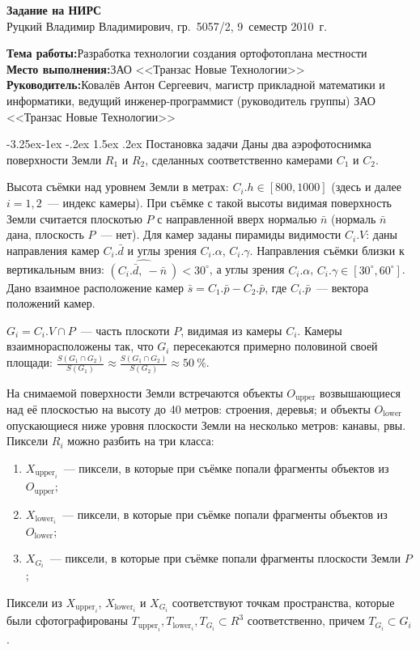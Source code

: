 \documentclass[a4paper,10pt]{article}
\makeatletter
\renewcommand\paragraph{\@startsection{paragraph}{4}{\z@}%
  {-3.25ex\@plus -1ex \@minus -.2ex}%
  {1.5ex \@plus .2ex}%
  {\normalfont\normalsize\bfseries}}
\makeatother
\begin{document}
\begin{center}
\begin{spacing}{1.5}
  {\Large\bfseries Задание на НИРС} \\
  {\large Руцкий Владимир Владимирович, гр.~5057/2, 9~семестр 2010~г.}
\end{spacing}
\end{center}

\noindent\textbf{Тема работы:}\quad Разработка технологии создания ортофотоплана местности \\
\textbf{Место выполнения:}\quad ЗАО <<Транзас Новые Технологии>> \\
\textbf{Руководитель:}\quad Ковалёв Антон Сергеевич, 
магистр прикладной математики и информатики, 
ведущий инженер-программист (руководитель группы) ЗАО <<Транзас Новые Технологии>>

\paragraph{Постановка задачи}
Даны два аэрофотоснимка поверхности Земли $R_1$ и $R_2$, 
сделанных соответственно камерами $C_1$ и $C_2$.

Высота съёмки над уровнем Земли в метрах: $C_i.h \in [800, 1000]$ (здесь и далее $i=1,2$~--- индекс камеры).
При съёмке с такой высоты видимая поверхность Земли считается плоскотью $P$ с направленной вверх нормалью $\bar{n}$
(нормаль $\bar{n}$ дана, плоскость $P$~--- нет).
Для камер заданы пирамиды видимости $C_i.V$: 
даны направления камер $C_i.\bar{d}$ и углы зрения $C_i.\alpha$, $C_i.\gamma$.
Направления съёмки близки к вертикальным вниз: $\widehat{(C_i.\bar{d}, \ -\bar{n}\ )} < 30^{\circ}$,
а углы зрения $C_i.\alpha$, $C_i.\gamma \in [30^{\circ}, 60^{\circ}]$.
Дано взаимное расположение камер $\bar{s}=C_1.\bar{p} - C_2.\bar{p}$, 
где $C_i.\bar{p}$~--- вектора положений камер.

$G_i = C_i.V \cap P$~--- часть плоскоти $P$, видимая из камеры $C_i$.
Камеры взаимнорасположены так, что $G_i$ пересекаются примерно половиной своей площади:
$\frac{S(G_1 \cap G_2)}{S(G_1)} \approx \frac{S(G_1 \cap G_2)}{S(G_2)} \approx 50~\%$.

На снимаемой поверхности Земли встречаются объекты $O_{\mathrm{upper}}$ возвышающиеся над её плоскостью на высоту до 40 метров: 
строения, деревья; 
и объекты $O_{\mathrm{lower}}$ опускающиеся ниже уровня плоскости Земли на несколько метров: канавы, рвы.
Пиксели $R_i$ можно разбить на три класса: 
\begin{enumerate}[label=\arabic*)]
  \item $X_{\mathrm{upper}_i}$~--- пиксели, в которые при съёмке попали фрагменты объектов из $O_{\mathrm{upper}}$;
  \item $X_{\mathrm{lower}_i}$~--- пиксели, в которые при съёмке попали фрагменты объектов из $O_{\mathrm{lower}}$;
  \item $X_{G_i}$~--- пиксели, в которые при съёмке попали фрагменты плоскости Земли $P$;
\end{enumerate}
Пиксели из $X_{\mathrm{upper}_i}$, $X_{\mathrm{lower}_i}$ и $X_{G_i}$ 
соответствуют точкам пространства, которые были сфотографированы 
$T_{\mathrm{upper}_i}, T_{\mathrm{lower}_i},  T_{G_i} \subset R^3$ соответственно, 
причем $T_{G_i} \subset G_i$.
\end{document}
